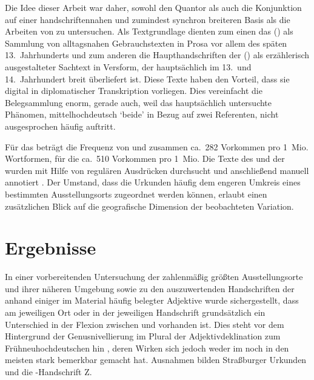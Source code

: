 Die Idee dieser Arbeit war daher, sowohl den Quantor als auch die Konjunktion
 auf einer handschriftennahen und zumindest synchron breiteren
Basis als die Arbeiten von \citet{askedal1973,askedal1974} zu untersuchen. Als
Textgrundlage dienten zum einen das  (\CAO{}) als
Sammlung von alltagsnahen Gebrauchstexten in Prosa vor allem des späten
13.~Jahrhunderts und zum anderen die Haupthandschriften der \KC{}
(\KC{}) als erzählerisch ausgestalteter Sachtext in Versform, der
hauptsächlich im 13.\ und 14.\ Jahrhundert breit über\-liefert ist. Diese Texte
haben den Vorteil, dass sie digital in diplomatischer Transkription vorliegen.
Dies vereinfacht die Belegsammlung enorm, gerade auch, weil das hauptsächlich
untersuchte Phänomen, mittelhochdeutsch  `beide' in Bezug auf
zwei Referenten, nicht ausgesprochen häufig auftritt.

Für das \CAO{} beträgt die Frequenz von  und 
zusammen ca.~282 Vorkommen pro 1~Mio. Wortformen, für die \KC{} ca.~510
Vorkommen pro 1~Mio. Die Texte des \CAO{} und der \KC{} wurden
mit Hilfe von regulären Ausdrücken durchsucht und anschließend manuell
annotiert \autocites[vgl.\ z.\,B.][33--37]{perkuhnetal2012}[zur Methode
vgl.][207--209]{beckerschallert2021}[155--158]{beckerschallert2022b}. Der
Umstand, dass die Urkunden häufig dem engeren Umkreis eines bestimmten
Ausstellungs\-orts zugeordnet werden können, erlaubt einen zusätzlichen Blick
auf die geografische Dimension der beobachteten Variation.

\section{Ergebnisse}

In einer vorbereitenden Untersuchung der zahlenmäßig größten Ausstellungsorte
und ihrer näheren Umgebung sowie zu den auszuwertenden Handschriften der
\KC{} anhand einiger im Material häufig belegter Adjektive wurde
sichergestellt, dass am jeweiligen Ort oder in der jeweiligen Handschrift
grundsätzlich ein Unterschied in der Flexion zwischen  und
 vorhanden ist. Dies steht vor dem Hintergrund der Genusnivellierung
im Plural der Adjektivdeklination zum Frühneuhochdeutschen hin
\autocite[191--192]{reichmannwegera1993}, deren Wirken sich jedoch weder im
\CAO{} noch in den meisten \KC{} stark bemerkbar gemacht hat.
Ausnahmen bilden Straßburger Urkunden und die \KC{}-Handschrift
Z.

